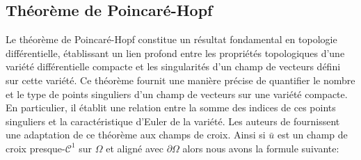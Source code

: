 \subsection{Théorème de Poincaré-Hopf}
\label{subsec:Poincare_Hopf}

Le théorème de Poincaré-Hopf constitue un résultat fondamental en topologie différentielle, établissant un lien profond entre les propriétés topologiques d'une variété différentielle compacte et les singularités d'un champ de vecteurs défini sur cette variété. Ce théorème fournit une manière précise de quantifier le nombre et le type de points singuliers d'un champ de vecteurs sur une variété compacte. En particulier, il établit une relation entre la somme des indices de ces points singuliers et la caractéristique d'Euler de la variété. Les auteurs de \cite{ray2008n} fournissent une adaptation de ce théorème aux champs de croix. Ainsi si $\bar{u}$ est un champ de croix presque-$\mathcal{C}^1$ sur $\Omega$ et aligné avec $\partial\Omega$ alors nous avons la formule suivante:

